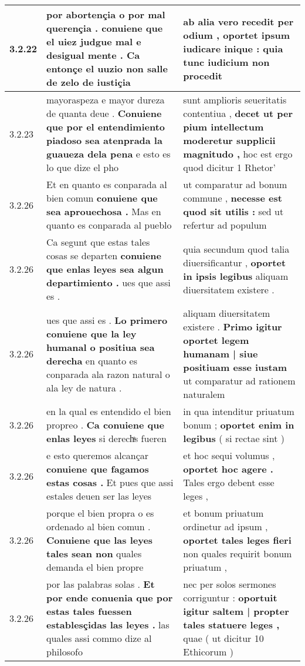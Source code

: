 \begin{tabular}{|p{1cm}|p{6.5cm}|p{6.5cm}|}
3.2.22 & por abortençia o por mal querençia . \textbf{ conuiene que el uiez judgue mal e desigual mente . } Ca entonçe el uuzio non salle de zelo de iustiçia & ab alia vero recedit per odium , \textbf{ oportet ipsum iudicare inique : } quia tunc iudicium non procedit \\\hline
3.2.23 & mayoraspeza e mayor dureza de quanta deue . \textbf{ Conuiene que por el entendimiento piadoso sea atenprada la guaueza dela pena } e esto es lo que dize el pho & sunt amplioris seueritatis contentiua , \textbf{ decet ut per pium intellectum moderetur supplicii magnitudo , } hoc est ergo quod dicitur 1 Rhetor’ \\\hline
3.2.26 & Et en quanto es conparada al bien comun \textbf{ conuiene que sea aprouechosa . } Mas en quanto es conparada al pueblo & ut comparatur ad bonum commune , \textbf{ necesse est quod sit utilis : } sed ut refertur ad populum \\\hline
3.2.26 & Ca segunt que estas tales cosas se departen \textbf{ conuiene que enlas leyes sea algun departimiento . } ues que assi es . & quia secundum quod talia diuersificantur , \textbf{ oportet in ipsis legibus } aliquam diuersitatem existere . \\\hline
3.2.26 & ues que assi es . \textbf{ Lo primero conuiene que la ley humanal o positiua sea derecha } en quanto es conparada ala razon natural o ala ley de natura . & aliquam diuersitatem existere . \textbf{ Primo igitur oportet legem humanam | siue positiuam esse iustam } ut comparatur ad rationem naturalem \\\hline
3.2.26 & en la qual es entendido el bien propreo . \textbf{ Ca conuiene que enlas leyes } si derechͣs fueren & in qua intenditur priuatum bonum ; \textbf{ oportet enim in legibus } ( si rectae sint ) \\\hline
3.2.26 & e esto queremos alcançar \textbf{ conuiene que fagamos estas cosas . } Et pues que assi estales deuen ser las leyes & et hoc sequi volumus , \textbf{ oportet hoc agere . } Tales ergo debent esse leges , \\\hline
3.2.26 & porque el bien propra o es ordenado al bien comun . \textbf{ Conuiene que las leyes tales sean non } quales demanda el bien propre & et bonum priuatum ordinetur ad ipsum , \textbf{ oportet tales leges fieri } non quales requirit bonum priuatum , \\\hline
3.2.26 & por las palabras solas . \textbf{ Et por ende conuenia que por estas tales fuessen establesçidas las leyes . } las quales assi commo dize al philosofo & nec per solos sermones corriguntur : \textbf{ oportuit igitur saltem | propter tales statuere leges , } quae ( ut dicitur 10 Ethicorum ) \\\hline

\end{tabular}
